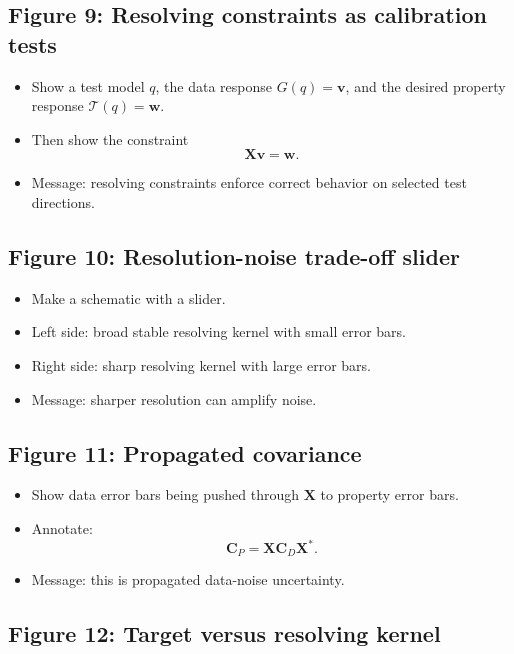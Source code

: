 \documentclass[11pt,openany]{book}
\theoremstyle{definition}
\theoremstyle{remark}
\newcommand{\Tau}{\mathcal{T}}
\begin{document}
\subsection*{Figure 9: Resolving constraints as calibration tests}

\begin{itemize}[leftmargin=*]
  \item Show a test model \(q\), the data response \(G(q)=\mathbf v\), and the desired property
  response \(\Tau(q)=\mathbf w\).
  \item Then show the constraint
  \[
    \mathbf X\mathbf v=\mathbf w.
  \]
  \item Message: resolving constraints enforce correct behavior on selected test directions.
\end{itemize}

\subsection*{Figure 10: Resolution-noise trade-off slider}

\begin{itemize}[leftmargin=*]
  \item Make a schematic with a slider.
  \item Left side: broad stable resolving kernel with small error bars.
  \item Right side: sharp resolving kernel with large error bars.
  \item Message: sharper resolution can amplify noise.
\end{itemize}

\subsection*{Figure 11: Propagated covariance}

\begin{itemize}[leftmargin=*]
  \item Show data error bars being pushed through \(\mathbf X\) to property error bars.
  \item Annotate:
  \[
    \mathbf C_P=\mathbf X\mathbf C_D\mathbf X^*.
  \]
  \item Message: this is propagated data-noise uncertainty.
\end{itemize}

\subsection*{Figure 12: Target versus resolving kernel}
\end{document}
